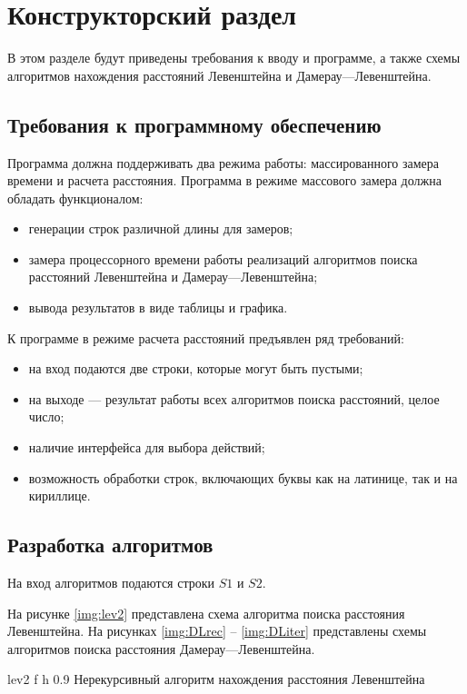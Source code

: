 \chapter{Конструкторский раздел}


В этом разделе будут приведены требования к вводу и программе, а также схемы алгоритмов нахождения расстояний Левенштейна и Дамерау---Левенштейна.

\section{Требования к программному обеспечению}
Программа должна поддерживать два режима работы: массированного замера времени и расчета расстояния. 
Программа в режиме массового замера должна обладать функционалом:
\begin{itemize}
	\item генерации строк различной длины для замеров;
	\item замера процессорного времени работы реализаций алгоритмов поиска расстояний Левенштейна и Дамерау---Левенштейна;
	\item вывода результатов в виде таблицы и графика.
\end{itemize}

К программе в режиме расчета расстояний предъявлен ряд требований:
\begin{itemize}
	\item на вход подаются две строки, которые могут быть пустыми;
	\item на выходе --- результат работы всех алгоритмов поиска расстояний, целое число;
	\item наличие интерфейса для выбора действий;
	\item возможность обработки строк, включающих буквы как на латинице, так и на кириллице.
\end{itemize}


\section{Разработка алгоритмов}

На вход алгоритмов подаются строки $S1$ и $S2$.

На рисунке \ref{img:lev2} представлена схема алгоритма поиска расстояния Левенштейна.
На рисунках \ref{img:DLrec} -- \ref{img:DLiter} представлены схемы алгоритмов поиска расстояния Дамерау---Левенштейна.

{lev2} %
{f} %
{h} %
{0.9\textwidth} %
{Нерекурсивный алгоритм нахождения расстояния Левенштейна} %

